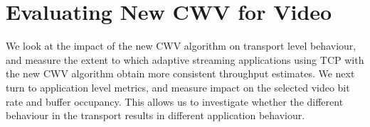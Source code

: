 \documentclass[10pt,sigconf]{acmart}
\newcommand{\todo}[1]{\textbf{\textcolor{red}{To do: #1}}}
\begin{document}







\section{Evaluating New CWV for Video}
\label{sec:evaluation}

We look at the impact of the new CWV algorithm on transport level behaviour, and measure the extent to which adaptive streaming applications using TCP with the new CWV algorithm obtain more consistent throughput estimates. We next turn to application level metrics, and measure impact on the selected video bit rate and buffer occupancy. This allows us to investigate whether the different behaviour in the transport results in different application behaviour. 
\end{document}

